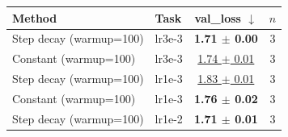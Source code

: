\begin{tabular}{llcc}
\toprule
Method & Task & val\_loss $\downarrow$ & $n$ \\
\midrule
Step decay (warmup=100) & lr3e-3 & \textbf{1.71 $\pm$ 0.00} & 3 \\
Constant (warmup=100) & lr3e-3 & \underline{1.74 $\pm$ 0.01} & 3 \\
\midrule
Step decay (warmup=100) & lr1e-3 & \underline{1.83 $\pm$ 0.01} & 3 \\
Constant (warmup=100) & lr1e-3 & \textbf{1.76 $\pm$ 0.02} & 3 \\
\midrule
Step decay (warmup=100) & lr1e-2 & \textbf{1.71 $\pm$ 0.01} & 3 \\
\bottomrule
\end{tabular}
